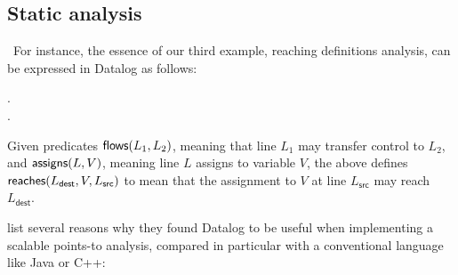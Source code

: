 
\subsection{Static analysis}

\XXX\ For instance, the essence of our third example, reaching definitions
analysis, can be expressed in Datalog as follows:

\begin{datalog}
   \gets {}.
  \\
  \gets
  \neg{}
  \conj
  \conj 
  .
\end{datalog}

\noindent
Given predicates $\text{\sffamily flows}({L_1, L_2})$, meaning that line $L_1$ may transfer
control to $L_2$, and $\text{\sffamily assigns}({L, V})$, meaning line $L$ assigns to
variable $V$, the above defines $\text{\sffamily reaches}({L_{\textsf{dest}}, V,
  L_{\textsf{src}}})$ to mean that the assignment to $V$ at line
$L_{\textsf{src}}$ may reach $L_{\textsf{dest}}$.


\citet{DBLP:conf/datalog/SmaragdakisB10} list several reasons why they found
Datalog to be useful when implementing a scalable points-to analysis, compared
in particular with a conventional language like Java or C++:

